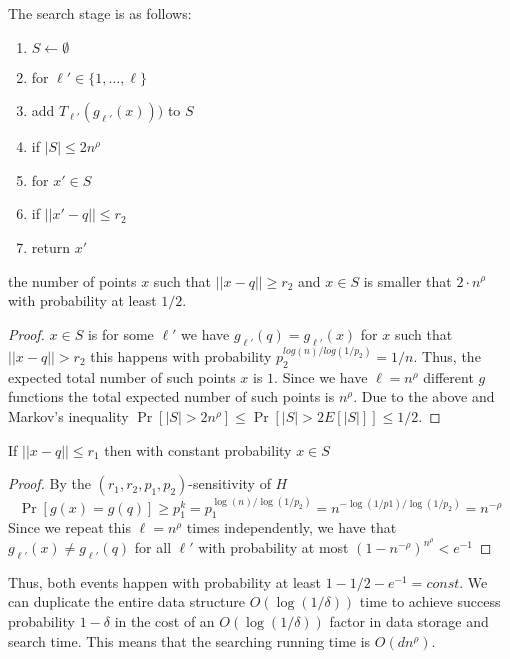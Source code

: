 The search stage is as follows:
\begin{enumerate}
\item $S \leftarrow \emptyset$
\item for $\ell' \in \{1,\ldots,\ell\} $
\item  \tab add $T_{\ell'}(g_{\ell'}(x)))$ to $S$
\item if $|S| \le 2n^{\rho}$
\item \tab for $x' \in S$
\item \tab  \tab if $||x' - q|| \le r_2$
\item \tab \tab \tab return  $x'$
\end{enumerate}



\begin{fact}
the number of points $x$ such that $||x-q|| \ge r_2$ and $x \in S$ is smaller that
$2\cdot n^{\rho}$ with probability at least $1/2$. 
\end{fact}
\begin{proof}
$x \in S$ is for some $\ell'$ we have $g_{\ell'}(q)  = g_{\ell'}(x)$ for $x$ such that $||x-q||>r_2$
this happens with probability $p_{2}^{log(n)/log(1/p_2)} = 1/n$. Thus, the expected total number of 
such points $x$ is $1$. Since we have $\ell = n^{\rho}$ different $g$ functions the total expected number of such
points is $n^{\rho}$. Due to the above and Markov's inequality $\Pr[|S| > 2n^{\rho}] \le \Pr[|S| > 2E[|S|]] \le 1/2$.   
\end{proof}

\begin{fact}
If $||x-q|| \le r_1$ then with constant probability $x \in S$
\end{fact}
\begin{proof}
By the $(r_1,r_2,p_1,p_2)$-sensitivity of $H$
\[
\Pr[g(x) = g(q)] \ge p_{1}^{k} = p_{1}^{\log(n)/\log(1/p_2)} = n^{-\log(1/p1)/\log(1/p_2)} = n^{-\rho}
\]
Since we repeat this $\ell = n^{\rho}$ times independently, we have that  $g_{\ell'}(x) \not = g_{\ell'}(q)$ for all 
$\ell'$ with probability at most $(1-n^{-\rho})^{n^{\rho}} < e^{-1}$ 
\end{proof}

Thus, both events happen with probability at least $1 - 1/2 - e^{-1} = const$.
We can duplicate the entire data structure $O(\log(1/\delta))$ time to achieve success probability $1-\delta$
in the cost of an $O(\log(1/\delta))$ factor in data storage and search time.
This means that the searching running time is $O(dn^{\rho})$.

